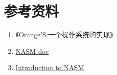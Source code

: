 \documentclass[a4paper]{article}
\begin{document}
\section{参考资料}
	\begin{enumerate}
		\item 《Orange'S:一个操作系统的实现》
		\item \href{http://www.nasm.us/doc/} {NASM doc}
		\item \href{http://jingliu.me/my_files/nasm.pdf}{Introduction to NASM}
	\end{enumerate}
\end{document}
